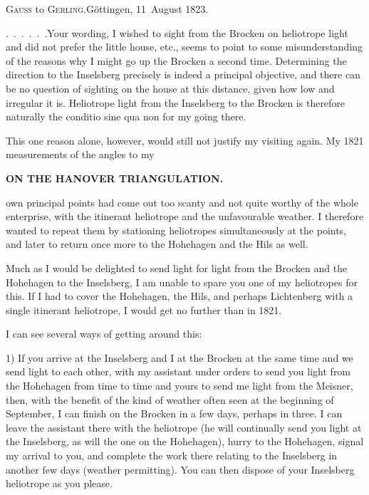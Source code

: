 \begingroup
\newcommand{\GerlingSeconds}[2]{#1\makebox[.42em][c]{,\makebox[0pt][r]{\textsuperscript{s}}}#2}
\begin{center}
\textsc{Gauss} to \textsc{Gerling}.\quad Göttingen, 11~August 1823.
\end{center}

\par\noindent\hspace*{\parindent}\mbox{.\ .\ .\ .\ .\ .\quad Your} wording,  I wished to sight from the Brocken on heliotrope light and did not prefer the little house, etc., seems to point to some misunderstanding of the reasons why I might go up the Brocken a second time.
Determining the direction to the Inselsberg precisely is indeed a principal objective, and there can be no question of sighting on the house at this distance, given how low and irregular it is.
Heliotrope light from the Inselsberg to the Brocken is therefore naturally the conditio sine qua non for my going there.
\par\noindent\hspace*{\parindent}This one reason alone, however, would still not justify my visiting again.
My 1821 measurements of the angles to my
\par\clearpage
\noindent\null\hfill{\small\textbf{ON THE HANOVER TRIANGULATION.}}\hfill{}\par\medskip
\noindent own principal points had come out too scanty and not quite worthy of the whole enterprise, with the itinerant heliotrope and the unfavourable weather. I therefore wanted to repeat them by stationing heliotropes simultaneously at the points, and later to return once more to the Hohehagen and the Hils as well.
\par\noindent\hspace*{\parindent}Much as I would be delighted to send light for light from the Brocken and the Hohehagen to the Inselsberg, I am unable to spare you one of my heliotropes for this. If I had to cover the Hohehagen, the Hils, and perhaps Lichtenberg with a single itinerant heliotrope, I would get no further than in 1821.
\par\noindent\hspace*{\parindent}I can see several ways of getting around this:
\par\noindent\hspace*{\parindent}1) If you arrive at the Inselsberg and I at the Brocken at the same time and we send light to each other, with my assistant under orders to send you light from the Hohehagen from time to time and yours to send me light from the Meisner, then, with the benefit of the kind of weather often seen at the beginning of September, I can finish on the Brocken in a few days, perhaps in three. I can leave the assistant there with the heliotrope (he will continually send you light at the Inselsberg, as will the one on the Hohehagen), hurry to the Hohehagen, signal my arrival to you, and complete the work there relating to the Inselsberg in another few days (weather permitting). You can then dispose of your Inselsberg heliotrope as you please.
